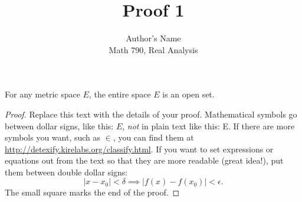 \documentclass{article}
\newenvironment{theorem}[2][Theorem]{\begin{trivlist}
\item[\hskip \labelsep {\bfseries #1}\hskip \labelsep {\bfseries #2.}]}{\end{trivlist}}
\begin{document}

\title{Proof 1} %
\author{Author's Name\\Math 790, Real Analysis} %

\maketitle

%

\begin{theorem}{(Page 4 $\#$ 6)}
For any metric space $E$, the entire space $E$ is an open set.
\end{theorem}

\begin{proof}
Replace this text with the details of your proof. Mathematical symbols go between dollar signs, like this: $E$, \emph{not} in plain text like this: E. If there are more symbols you want, such as $\in$, you can find them at\\ \url{http://detexify.kirelabs.org/classify.html}. If you want to set expressions or equations out from the text so that they are more readable (great idea!), put them between double dollar signs: $$|x-x_0| < \delta \implies |f(x)-f(x_0)| < \epsilon.$$
The small square marks the end of the proof.
\end{proof}


\end{document}
